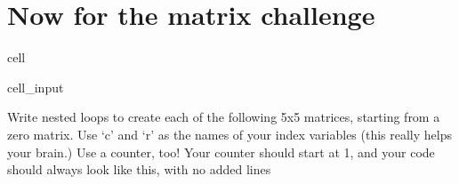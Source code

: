 \documentclass[letterpaper,10pt,english]{jupyterBook}
\begin{document}
\section{Now for the matrix challenge}
\label{\detokenize{lessons/Matrices_Index_Warmup-Student:now-for-the-matrix-challenge}}
\begin{sphinxuseclass}{cell}\begin{sphinxVerbatimInput}

\begin{sphinxuseclass}{cell_input}
\begin{sphinxVerbatim}[commandchars=\\\{\}]
   
\end{sphinxVerbatim}

\end{sphinxuseclass}\end{sphinxVerbatimInput}

\end{sphinxuseclass}
\sphinxAtStartPar
Write nested loops to create each of the following 5x5 matrices, starting from a zero matrix. Use ‘c’ and ‘r’ as the names of your index variables (this really helps your brain.) Use a counter, too! Your counter should  start at 1, and your code should always look like this, with no added lines
\end{document}
